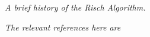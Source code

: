 \emph{A brief history of the Risch Algorithm.}

\emph{The relevant references here
are~\cite{moses1971symbolic,risch1969problem}}
